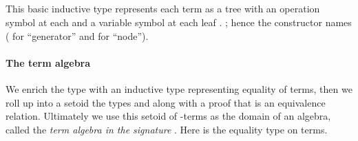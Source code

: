 \begin{code}%
\>[0]\<%
\\
\>[0]\AgdaSpace{}%
\AgdaSpace{}%
\AgdaSymbol{(}\AgdaSpace{}%
\AgdaSymbol{:}\AgdaSpace{}%
\AgdaSpace{}%
\AgdaSpace{}%
\AgdaSymbol{)}\AgdaSpace{}%
\AgdaSymbol{:}\AgdaSpace{}%
\AgdaSpace{}%
\AgdaSymbol{(}\AgdaSpace{}%
\AgdaSymbol{)}%
\>[39]\<%
\\
\>[0][@{}l@{\AgdaIndent{0}}]%
\>[1]\AgdaSpace{}%
\AgdaSymbol{:}\AgdaSpace{}%
\AgdaSpace{}%
\AgdaSpace{}%
\AgdaSpace{}%
\<%
\\
%
\>[1]\AgdaSpace{}%
\AgdaSymbol{:}\AgdaSpace{}%
\AgdaSymbol{(}\AgdaSpace{}%
\AgdaSymbol{:}\AgdaSpace{}%
\AgdaSpace{}%
\AgdaSpace{}%
\AgdaSymbol{)(}\AgdaSpace{}%
\AgdaSymbol{:}\AgdaSpace{}%
\AgdaSpace{}%
\AgdaSpace{}%
\AgdaSpace{}%
\AgdaSpace{}%
\AgdaSpace{}%
\AgdaSpace{}%
\AgdaSymbol{)}\AgdaSpace{}%
\AgdaSpace{}%
\AgdaSpace{}%
\<%
\\
\>[0]\<%
\end{code}
This basic inductive type represents each term as a tree with an operation symbol at each
 and a variable symbol at each leaf %
\ifshort
.
\else
; hence the constructor names
( for ``generator'' and  for ``node'').
\fi

\paragraph*{The term algebra}
We enrich the  type with
an inductive type  representing equality of terms, then we roll up
into a setoid the types  and  along with a proof that
 is an equivalence relation. Ultimately we use this setoid of -terms
as the domain of an algebra, called the \emph{term algebra in the signature} .
Here is the equality type on terms.

